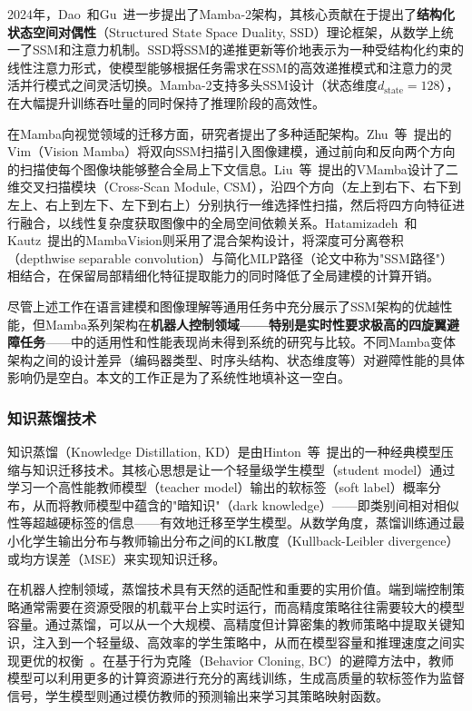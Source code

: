 \documentclass[12pt,a4paper]{article}
\numberwithin{equation}{section}
\numberwithin{figure}{section}
\numberwithin{table}{section}
\begin{document}
2024年，Dao~和Gu~\cite{dao2024mamba2}进一步提出了Mamba-2架构，其核心贡献在于提出了\textbf{结构化状态空间对偶性}（Structured State Space Duality, SSD）理论框架，从数学上统一了SSM和注意力机制。SSD将SSM的递推更新等价地表示为一种受结构化约束的线性注意力形式，使模型能够根据任务需求在SSM的高效递推模式和注意力的灵活并行模式之间灵活切换。Mamba-2支持多头SSM设计（状态维度$d_{\text{state}}=128$），在大幅提升训练吞吐量的同时保持了推理阶段的高效性。

在Mamba向视觉领域的迁移方面，研究者提出了多种适配架构。Zhu~等~\cite{zhu2024vim}提出的Vim（Vision Mamba）将双向SSM扫描引入图像建模，通过前向和反向两个方向的扫描使每个图像块能够整合全局上下文信息。Liu~等~\cite{liu2024vmamba}提出的VMamba设计了二维交叉扫描模块（Cross-Scan Module, CSM），沿四个方向（左上到右下、右下到左上、右上到左下、左下到右上）分别执行一维选择性扫描，然后将四方向特征进行融合，以线性复杂度获取图像中的全局空间依赖关系。Hatamizadeh~和Kautz~\cite{hatamizadeh2024mambavision}提出的MambaVision则采用了混合架构设计，将深度可分离卷积（depthwise separable convolution）与简化MLP路径（论文中称为"SSM路径"）相结合，在保留局部精细化特征提取能力的同时降低了全局建模的计算开销。

尽管上述工作在语言建模和图像理解等通用任务中充分展示了SSM架构的优越性能，但Mamba系列架构在\textbf{机器人控制领域——特别是实时性要求极高的四旋翼避障任务}——中的适用性和性能表现尚未得到系统的研究与比较。不同Mamba变体架构之间的设计差异（编码器类型、时序头结构、状态维度等）对避障性能的具体影响仍是空白。本文的工作正是为了系统性地填补这一空白。

\subsubsection{知识蒸馏技术}

知识蒸馏（Knowledge Distillation, KD）是由Hinton~等~\cite{hinton2015distilling}提出的一种经典模型压缩与知识迁移技术。其核心思想是让一个轻量级学生模型（student model）通过学习一个高性能教师模型（teacher model）输出的软标签（soft label）概率分布，从而将教师模型中蕴含的"暗知识"（dark knowledge）——即类别间相对相似性等超越硬标签的信息——有效地迁移至学生模型。从数学角度，蒸馏训练通过最小化学生输出分布与教师输出分布之间的KL散度（Kullback-Leibler divergence）或均方误差（MSE）来实现知识迁移。

在机器人控制领域，蒸馏技术具有天然的适配性和重要的实用价值。端到端控制策略通常需要在资源受限的机载平台上实时运行，而高精度策略往往需要较大的模型容量。通过蒸馏，可以从一个大规模、高精度但计算密集的教师策略中提取关键知识，注入到一个轻量级、高效率的学生策略中，从而在模型容量和推理速度之间实现更优的权衡~\cite{chen2020distilling}。在基于行为克隆（Behavior Cloning, BC）的避障方法中，教师模型可以利用更多的计算资源进行充分的离线训练，生成高质量的软标签作为监督信号，学生模型则通过模仿教师的预测输出来学习其策略映射函数。
\end{document}

